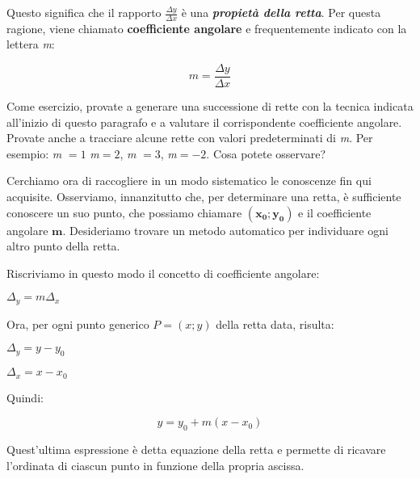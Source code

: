 Questo significa che il rapporto $\frac{\Delta y}{\Delta x}$ è una {\bfseries \slshape {propietà della retta}}.
Per questa ragione, viene chiamato {\bfseries coefficiente angolare} e frequentemente indicato con la lettera {\slshape m}:
\begin{center}
\begin{equation}
m = \frac{\Delta y}{\Delta x}
\end{equation}
\end{center}

Come esercizio, provate a generare una successione di rette con la tecnica indicata all'inizio di questo paragrafo e a valutare il corrispondente coefficiente angolare.\newline
Provate anche a tracciare alcune rette con valori predeterminati di {\slshape m}. Per esempio: {\slshape m} $= 1$ {\slshape m}$ = 2$, {\slshape m} $= 3$, {\slshape m}$ = -2$.\newline
Cosa potete osservare?
\newline

Cerchiamo ora di raccogliere in un modo sistematico le conoscenze fin qui acquisite.
\newline
Osserviamo, innanzitutto che, per determinare una retta, è sufficiente conoscere un suo punto, che possiamo chiamare $\mathbf {(x_0;y_0)}$ e il coefficiente angolare $\mathbf m$.
\newline
Desideriamo trovare un metodo automatico per individuare ogni altro punto della retta.
\newline

Riscriviamo in questo modo il concetto di coefficiente angolare:
\newline
\begin{center}
\begin{math}
\Delta_y = m \Delta_x
\end{math}
\end{center}
Ora, per ogni punto generico $P = (x;y)$ della retta data, risulta:
\begin{center}
\begin{math}
\Delta_y = y - y_0
\end{math}
\end{center}
\begin{center}
\begin{math}
\Delta_x = x - x_0
\end{math}
\end{center}
Quindi:
\begin{center}
\begin{equation}\label{eq:equazioneDellaRetta}
y = y_0 + m (x -x_0)
\end{equation}
\end{center}
Quest'ultima espressione è detta equazione della retta e permette di ricavare l'ordinata di ciascun punto in funzione della propria ascissa.
